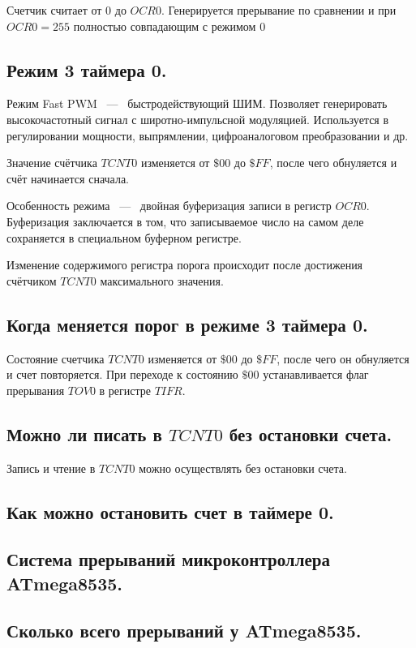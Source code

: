 Счетчик считает от $0$ до $OCR0$. Генерируется прерывание по сравнении и при $OCR0 = 255$ 
полностью совпадающим с режимом $0$

\subsection{Режим 3 таймера 0.}
Режим Fast PWM ~---~ быстродействующий ШИМ. Позволяет генерировать
высокочастотный сигнал с широтно-импульсной модуляцией. Используется 
в регулировании мощности, выпрямлении, цифроаналоговом преобразовании и др.

Значение счётчика $TCNT0$ изменяется от $\$00$ до $\$FF$, после чего 
обнуляется и счёт начинается сначала. 


Особенность режима ~---~ двойная буферизация записи в регистр $OCR0$.
Буферизация заключается в том, что записываемое число на самом деле сохраняется в
специальном буферном регистре.

Изменение содержимого регистра порога происходит после достижения 
счётчиком $TCNT0$ максимального значения. 

\subsection{Когда меняется порог в режиме 3 таймера 0.}
Состояние счетчика $TCNT0$ изменяется от $\$00$ до $\$FF$, после чего он обнуляется и счет 
повторяется. При переходе к состоянию $\$00$ устанавливается флаг прерывания $TOV0$ в 
регистре $TIFR$.

\subsection{Можно ли писать в $TCNT0$ без остановки счета.}

Запись и чтение в $TCNT0$ можно осуществлять без остановки счета.

\subsection{Как можно остановить счет в таймере 0.}


\subsection{Система прерываний микроконтроллера ATmega8535.}


\subsection{Сколько всего прерываний у ATmega8535.}


